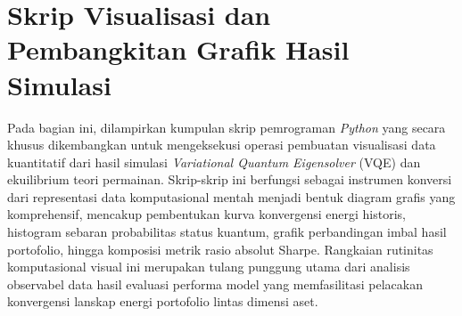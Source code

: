 \chapter{Skrip Visualisasi dan Pembangkitan Grafik Hasil Simulasi}

Pada bagian ini, dilampirkan kumpulan skrip pemrograman \textit{Python} yang secara khusus dikembangkan untuk mengeksekusi operasi pembuatan visualisasi data kuantitatif dari hasil simulasi \textit{Variational Quantum Eigensolver} (VQE) dan ekuilibrium teori permainan. Skrip-skrip ini berfungsi sebagai instrumen konversi dari representasi data komputasional mentah menjadi bentuk diagram grafis yang komprehensif, mencakup pembentukan kurva konvergensi energi historis, histogram sebaran probabilitas status kuantum, grafik perbandingan imbal hasil portofolio, hingga komposisi metrik rasio absolut Sharpe. Rangkaian rutinitas komputasional visual ini merupakan tulang punggung utama dari analisis observabel data hasil evaluasi performa model yang memfasilitasi pelacakan konvergensi lanskap energi portofolio lintas dimensi aset.

